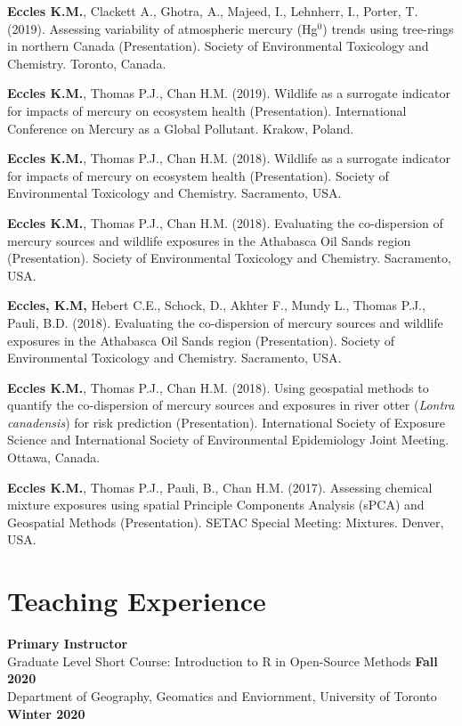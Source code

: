 \documentclass[margin,line]{res}
\begin{document}
\begin{resume}
\textbf{Eccles K.M.}, Clackett A., Ghotra, A., Majeed, I., Lehnherr, I., Porter, T. (2019). Assessing variability of atmospheric mercury (Hg$^{0}$) trends using tree-rings in northern Canada (Presentation). Society of Environmental Toxicology and Chemistry. Toronto, Canada.

\textbf{Eccles K.M.}, Thomas P.J., Chan H.M. (2019). Wildlife as a surrogate indicator for impacts of mercury on ecosystem health (Presentation). International Conference on Mercury as a Global Pollutant. Krakow, Poland.

\textbf{Eccles K.M.}, Thomas P.J., Chan H.M. (2018). Wildlife as a surrogate indicator for impacts of mercury on ecosystem health (Presentation). Society of Environmental Toxicology and Chemistry. Sacramento, USA.

\textbf{Eccles K.M.}, Thomas P.J., Chan H.M. (2018). Evaluating the co-dispersion of mercury sources and wildlife exposures in the Athabasca Oil Sands region (Presentation). Society of Environmental Toxicology and Chemistry. Sacramento, USA.

\textbf{Eccles, K.M,} Hebert C.E., Schock, D., Akhter F., Mundy L., Thomas P.J., Pauli, B.D. (2018). Evaluating the co-dispersion of mercury sources and wildlife exposures in the Athabasca Oil Sands region (Presentation). Society of Environmental Toxicology and Chemistry. Sacramento, USA.

\textbf{Eccles K.M.}, Thomas P.J., Chan H.M. (2018). Using geospatial methods to quantify the co-dispersion of mercury sources and exposures in river otter (\textit{Lontra canadensis}) for risk prediction (Presentation). International Society of Exposure Science and International Society of Environmental Epidemiology Joint Meeting. Ottawa, Canada.

\textbf{Eccles K.M.}, Thomas P.J., Pauli, B., Chan H.M. (2017). Assessing chemical mixture exposures using spatial Principle Components Analysis (sPCA) and Geospatial Methods (Presentation). SETAC Special Meeting: Mixtures. Denver, USA.

\vspace*{.1in}
\section{\sc Teaching Experience}
\textbf{Primary Instructor}\\
Graduate Level Short Course: Introduction to R in Open-Source Methods \hfill {\textbf{Fall 2020}}\\
Department of Geography, Geomatics and Enviornment, University of Toronto \hfill {\textbf{Winter 2020}}


\end{resume}
\end{document}

